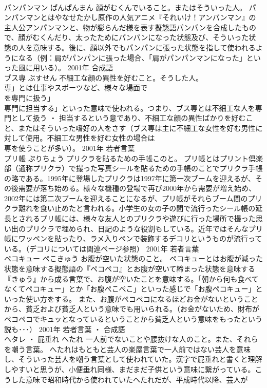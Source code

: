 \documentclass[8pt]{extreport}
\begin{document}
\begin{CJK}{UTF8}{min}
\\	パンパンマン	ぱんぱんまん	顔がむくんでいること。またはそういった人。	パンパンマンとはやなせたかし原作の人気アニメ『それいけ！アンパンマン』の主人公アンパンマンと、物が膨らんだ様を表す擬態語パンパンを合成したもので、顔がむくんだり、太ったためにパンパンになった状態及び、そういった状態の人を意味する。後に、顔以外でもパンパンに張った状態を指して使われるようになる（例：肩がパンパンに張った場合、「肩がパンパンマンになった」といった風に用いる）。	2001年	合成語	
\\	ブス専	ぶすせん	不細工な顔の異性を好むこと。そうした人。	
\\	専」とは仕事やスポーツなど、様々な場面で
\\	を専門に扱う」
\\	専門に担当する」といった意味で使われる。つまり、ブス専とは不細工な人を専門として扱う ・ 担当するという意であり、不細工な顔の異性ばかりを好むこと、またはそういった嗜好の人をさす（ブス専は主に不細工な女性を好む男性に対して使用。不細工な男性を好む女性の場合は
\\	専を使うことが多い）。	2001年	若者言葉	
\\	プリ帳	ぷりちょう	プリクラを貼るための手帳このと。	プリ帳とはプリント倶楽部（通称プリクラ）で撮った写真シールを貼るための手帳のことでプリクラ手帳の略である。1995年に登場したプリクラは1997年に第一次ブームを迎えるが、その後需要が落ち始める。様々な機種の登場で再び2000年から需要が増え始め、2002年には第二次ブームを迎えることになるが、プリ帳がそれらブーム間のプリクラ離れを食い止めたと言われる。小学生の女の子の間で流行ったシール帳の延長とされるプリ帳には、様々な友人とのプリクラや遊びに行った場所で撮った思い出のプリクラで埋められ、日記のような役割もしている。近年ではそんなプリ帳にワッペンを貼ったり、ラメ入りペンで装飾するデコリというものが流行っている。（デコリについては関連ページ参照）	2001年	若者言葉	
\\	ペコキュー	ぺこきゅう	お腹が空いた状態のこと。	ペコキューとはお腹が減った状態を意味する擬態語の『ペコペコ』とお腹が空いて締まった状態を意味する『きゅう』から成る言葉で、お腹が空いたことを意味する。「朝から何も食べてなくてペコキュー」とか「お腹ぺこぺこ」といった感じで「お腹ペコキュー」といった使い方をする。 また、お腹がペコペコになるほどお金がないということから、貧乏および貧乏人という意味でも用いられる。（お金がないため、財布がペコペコでキュッとなっているということから貧乏人という意味をもったという説も･･･）	2001年	若者言葉 ・ 合成語	
\\	ヘタレ ・ 屁垂れ	へたれ	一人前でないことや腰抜けな人のこと。また、それらを嘲う言葉。	へたれはもともと芸人の楽屋言葉で一人前ではない芸人を意味し、そういった芸人を嘲う言葉として使われていた。漢字で屁垂れと書くと理解しやすいと思うが、小便垂れ同様、まだまだ子供という意味に繋がっている。こうした意味で昭和時代から使われていたへたれだが、平成時代以降、芸人が

\end{CJK}
\end{document}
